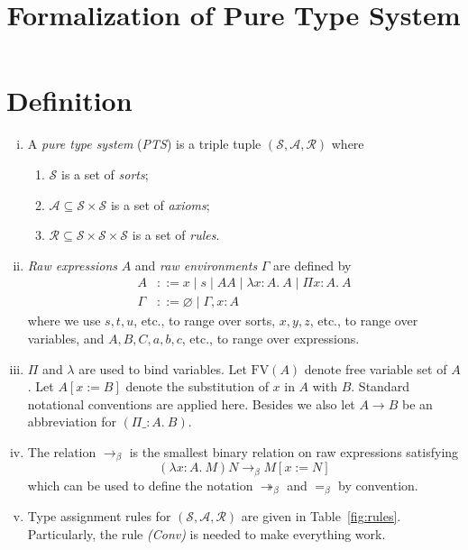 \documentclass[oneside,a4paper]{article}
\title{\bf Formalization of Pure Type System}
\author{}
\date{}
\numberwithin{equation}{section}
\begin{document}
\maketitle

\section{Definition}
\begin{enumerate}[(i)]
\item A \emph{pure type system} (\emph{PTS}) is a triple tuple
  $(\mathcal{S},\mathcal{A},\mathcal{R})$ where

  \begin{enumerate}
  \item $\mathcal{S}$ is a set of \emph{sorts};
  \item $\mathcal{A}\subseteq \mathcal{S} \times \mathcal{S}$ is a set
    of \emph{axioms};
  \item
    $\mathcal{R}\subseteq \mathcal{S} \times \mathcal{S} \times
    \mathcal{S}$ is a set of \emph{rules}.
  \end{enumerate}

\item \emph{Raw expressions} $A$ and \emph{raw environments} $\Gamma$
  are defined by
  \begin{align*}
    A &::= x \mid s \mid AA \mid \lambda x:A.\ A \mid \Pi x:A.\ A\\
    \Gamma &::= \varnothing \mid \Gamma,x:A
  \end{align*}
  where we use $s,t,u$, etc., to range over sorts, $x,y,z$, etc., to
  range over variables, and $A,B,C,a,b,c$, etc., to range over
  expressions.

\item $\Pi$ and $\lambda$ are used to bind variables. Let
  $\mathrm{FV}(A)$ denote free variable set of $A$. Let $A[x:=B]$
  denote the substitution of $x$ in $A$ with $B$. Standard notational
  conventions are applied here. Besides we also let $A \to B$ be an
  abbreviation for $(\Pi \_:A.\ B)$.

\item The relation $\to _ \beta$ is the smallest binary relation on
  raw expressions satisfying
  \[ (\lambda x:A.\ M)N \to _ \beta M[x:=N] \]
  which can be used to define the notation $\twoheadrightarrow_\beta$
  and $=_\beta$ by convention.

\item Type assignment rules for
  $(\mathcal{S},\mathcal{A},\mathcal{R})$ are given in
  Table~\ref{fig:rules}. Particularly, the rule \emph{(Conv)} is
  needed to make everything work.


\end{enumerate}
\end{document}
